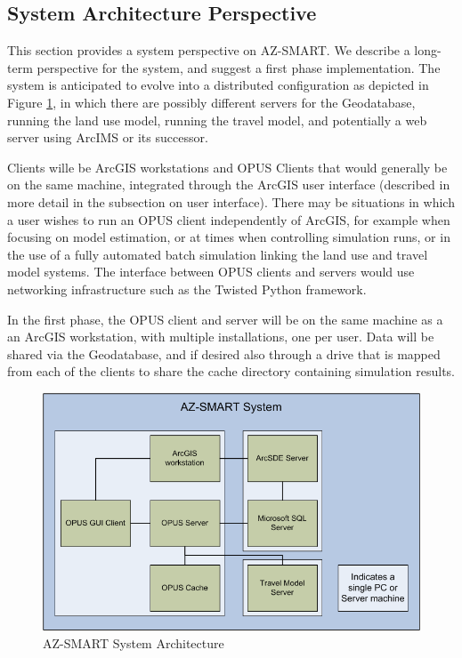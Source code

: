 \subsection{System Architecture Perspective}
This section provides a system perspective on AZ-SMART.  We describe a long-term perspective for the system, and suggest a first phase implementation.  The system is anticipated to evolve into a distributed configuration as depicted in Figure \ref{figSystem}, in which there are possibly different servers for the Geodatabase, running the land use model, running the travel model, and potentially a web server using ArcIMS or its successor.

Clients wille be ArcGIS workstations and OPUS Clients that would generally be on the same machine, integrated through the ArcGIS user interface (described in more detail in the subsection on user interface).  There may be situations in which a user wishes to run an OPUS client independently of ArcGIS, for example when focusing on model estimation, or at times when controlling simulation runs, or in the use of a fully automated batch simulation linking the land use and travel model systems.  The interface between OPUS clients and servers would use networking infrastructure such as the Twisted Python framework.  

In the first phase, the OPUS client and server will be on the same machine as a an ArcGIS workstation, with multiple installations, one per user.  Data will be shared via the Geodatabase, and if desired also through a drive that is mapped from each of the clients to share the cache directory containing simulation results.

\begin{figure}[h]
\begin{center}
\includegraphics[scale=0.5]{figures/AZ-SMART_system_diagram.png}
\caption{AZ-SMART System Architecture}
\label{figSystem}
\end{center}
\end{figure}
